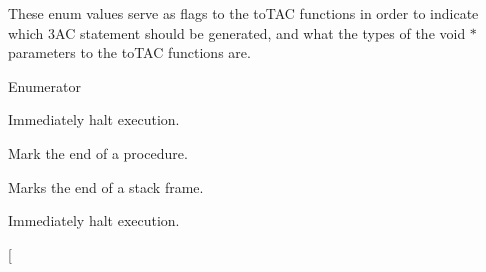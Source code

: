 These enum values serve as flags to the to\-T\-A\-C functions in order to indicate which 3\-A\-C statement should be generated, and what the types of the void $\ast$ parameters to the to\-T\-A\-C functions are. \begin{Desc}
\item[Enumerator]\par
\begin{description}
\item[{\em 
\hypertarget{classTAC__Generator_a3942f3e280fb83e44ad85eb13d56dfb5a8e16b137fe321cada85cb3ab596934f7}{H\-A\-L\-T}\label{classTAC__Generator_a3942f3e280fb83e44ad85eb13d56dfb5a8e16b137fe321cada85cb3ab596934f7}
}]Immediately halt execution. \item[{\em 
\hypertarget{classTAC__Generator_a3942f3e280fb83e44ad85eb13d56dfb5ab8cc9678456e68db56838ba762eb03cf}{E\-N\-D\-P\-R\-O\-C}\label{classTAC__Generator_a3942f3e280fb83e44ad85eb13d56dfb5ab8cc9678456e68db56838ba762eb03cf}
}]Mark the end of a procedure. \item[{\em 
\hypertarget{classTAC__Generator_a3942f3e280fb83e44ad85eb13d56dfb5a77c34b42184355e533cdb9105a1c779a}{E\-N\-D\-F\-R\-A\-M\-E}\label{classTAC__Generator_a3942f3e280fb83e44ad85eb13d56dfb5a77c34b42184355e533cdb9105a1c779a}
}]Marks the end of a stack frame. \item[{\em 
\hypertarget{classTAC__Generator_a3942f3e280fb83e44ad85eb13d56dfb5a8e16b137fe321cada85cb3ab596934f7}{H\-A\-L\-T}\label{classTAC__Generator_a3942f3e280fb83e44ad85eb13d56dfb5a8e16b137fe321cada85cb3ab596934f7}
}]Immediately halt execution. \item[{\em 
}
\end{description}
\end{Desc}
